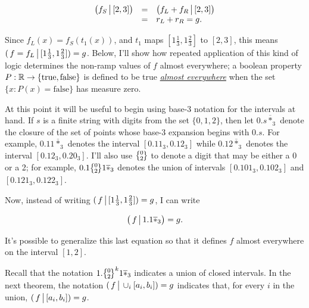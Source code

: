 \documentclass[20pt,]{extarticle}
\begin{document}
\[\begin{array}{rcl}
\big(f_S \,\big|\, [2,3]\big) & = & \big(f_L + f_R \,\big|\, [2, 3]\big) \\
 & = & r_L + r_R = g. \\
\end{array}\]

Since \(f_L(x) = f_S(t_1(x))\), and \(t_1\) maps
\([1\tfrac{1}{3}, 1\tfrac{2}{3}]\) to \([2,3]\), this means
\((\,f=f_L \,\big|\, [1\tfrac{1}{3}, 1\tfrac{2}{3}]) = g\). Below, I'll
show how repeated application of this kind of logic determines the
non-ramp values of \(f\) almost everywhere; a boolean property
\(P:\mathbb{R}\to\{\text{true},\text{false}\}\) is defined to be true
\href{https://en.wikipedia.org/wiki/Almost_everywhere}{\emph{almost
everywhere}} when the set \(\{x : P(x) = \text{false}\}\) has measure
zero.

\newcommand{\zerotwo}{\big\{\!\raise1.5pt\hbox{$\genfrac{}{}{0pt}{}
{\lower1.8pt\hbox{$\smash{\scriptstyle 0}$}}
{\lower1pt\hbox{$\smash{\scriptstyle 2}$}}$}\!\big\}}

\newcommand{\lstar}{\overline{*}_3}

At this point it will be useful to begin using base-3 notation for the
intervals at hand. If \(s\) is a finite string with digits from the set
\(\{0, 1, 2\}\), then let \(0.s\lstar\) denote the closure of the set of
points whose base-3 expansion begins with \(0.s\). For example,
\(0.11\lstar\) denotes the interval \([0.11_3, 0.12_3]\) while
\(0.12\lstar\) denotes the interval \([0.12_3, 0.20_3]\). I'll also use
\(\zerotwo\) to denote a digit that may be either a 0 or a 2; for
example, \(0.1\zerotwo 1\lstar\) denotes the union of intervals
\([0.101_3, 0.102_3]\) and \([0.121_3, 0.122_3]\).

Now, instead of writing
\((\,f \,\big|\, [1\tfrac{1}{3}, 1\tfrac{2}{3}]) = g\), I can write

\begin{equation}\big(\,f \restrict 1.1\lstar\big) = g.\label{eq:nonpl_base_case}\end{equation}

It's possible to generalize this last equation so that it defines \(f\)
almost everywhere on the interval \([1, 2]\).

Recall that the notation \(1.\zerotwo^k1\lstar\) indicates a union of
closed intervals. In the next theorem, the notation
\((\,f \,\big|\, \cup_i [a_i,b_i]) = g\) indicates that, for every \(i\)
in the union, \((\,f \,\big|\, [a_i,b_i]) = g\).
\end{document}
